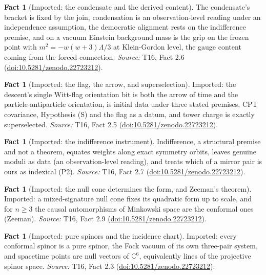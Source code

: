 \documentclass[11pt]{article}
\theoremstyle{definition}
\newtheorem{fact}[theorem]{Fact}
\theoremstyle{plain}
\providecommand{\C}{}\renewcommand{\C}{\mathbb{C}}
\begin{document}
\begin{fact}[Imported: the condensate and the derived content]\label{c:one-relation.imported-condensate-derived-content}
The condensate's bracket is fixed by the join, condensation is an observation-level reading under an independence assumption, the democratic alignment rests on the indifference premise, and on a vacuum Einstein background mass is the grip on the frozen point with $m^{2} = -w(w+3)\Lambda/3$ at Klein-Gordon level, the gauge content coming from the forced connection.
\emph{Source:} T16, Fact 2.6 (\href{https://doi.org/10.5281/zenodo.22723212}{doi:10.5281/zenodo.22723212}).
\end{fact}

\begin{fact}[Imported: the flag, the arrow, and superselection]\label{c:one-relation.imported-flag-arrow-superselection}
Imported: the descent's single Witt-flag orientation bit is both the arrow of time and the particle-antiparticle orientation, is initial data under three stated premises, CPT covariance, Hypothesis (S) and the flag as a datum, and tower charge is exactly superselected.
\emph{Source:} T16, Fact 2.5 (\href{https://doi.org/10.5281/zenodo.22723212}{doi:10.5281/zenodo.22723212}).
\end{fact}

\begin{fact}[Imported: the indifference instrument]\label{c:one-relation.imported-indifference-instrument}
Indifference, a structural premise and not a theorem, equates weights along exact symmetry orbits, leaves genuine moduli as data (an observation-level reading), and treats which of a mirror pair is ours as indexical (P2).
\emph{Source:} T16, Fact 2.7 (\href{https://doi.org/10.5281/zenodo.22723212}{doi:10.5281/zenodo.22723212}).
\end{fact}

\begin{fact}[Imported: the null cone determines the form, and Zeeman's theorem]\label{c:one-relation.imported-null-cone-determines-form-zeemans}
Imported: a mixed-signature null cone fixes its quadratic form up to scale, and for $n \ge 3$ the causal automorphisms of Minkowski space are the conformal ones (Zeeman).
\emph{Source:} T16, Fact 2.9 (\href{https://doi.org/10.5281/zenodo.22723212}{doi:10.5281/zenodo.22723212}).
\end{fact}

\begin{fact}[Imported: pure spinors and the incidence chart]\label{c:one-relation.imported-pure-spinors-incidence-chart}
Imported: every conformal spinor is a pure spinor, the Fock vacuum of its own three-pair system, and spacetime points are null vectors of $\C^6$, equivalently lines of the projective spinor space.
\emph{Source:} T16, Fact 2.3 (\href{https://doi.org/10.5281/zenodo.22723212}{doi:10.5281/zenodo.22723212}).
\end{fact}
\end{document}
